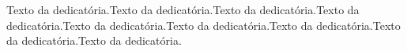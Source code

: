 

\begin{dedicatoria}
Texto da dedicatória.Texto da dedicatória.Texto da dedicatória.Texto da dedicatória.Texto da dedicatória.Texto da dedicatória.Texto da dedicatória.Texto da dedicatória.Texto da dedicatória.
\end{dedicatoria}




